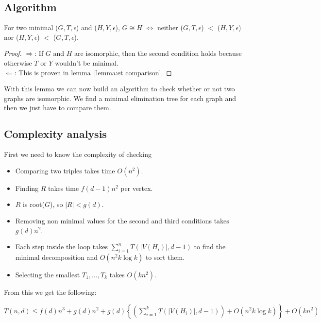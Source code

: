 \subsection{Algorithm}
\begin{lemma}
For two minimal ($G, T, \epsilon$) and ($H, Y, \epsilon$), $G \cong H$ $\iff$ neither ($G, T, \epsilon$) $<$ ($H, Y, \epsilon$) nor ($H, Y, \epsilon$) $<$ ($G, T, \epsilon$).
\end{lemma}



\begin{proof}
$\Longrightarrow$: If $G$ and $H$ are isomorphic, then the second condition holds because otherwise $T$ or $Y$ wouldn't be minimal.\\
$\Longleftarrow$: This is proven in lemma~\ref{lemma:et comparison}.
\end{proof}

With this lemma we can now build an algorithm to check whether or not two graphs are isomorphic. We find a minimal elimination tree for each graph and then we just have to compare them.







\subsection{Complexity analysis}

First we need to know the complexity of checking 

\begin{itemize}
\item Comparing two triples takes time $O(n^2)$.
\item Finding $R$ takes time $f(d-1)n^2$ per vertex.
\item $R$ is root($G$), so $|R| < g(d)$.
\item Removing non minimal values for the second and third conditions takes $g(d)n^2$.
\item Each step inside the loop takes $\sum\limits_{i=1}^n T(|V(H_i)|, d-1)$ to find the minimal decomposition and $O(n^2 k \log k)$ to sort them.
\item Selecting the smallest $T_1,\ldots, T_k$ takes $O(kn^2)$.
\end{itemize}

From this we get the following:

$T(n, d) \leq f(d)n^3 + g(d)n^2 + g(d) \left\{ \left(\sum\limits_{i=1}^k T(|V(H_i)|, d-1)\right) + O(n^2 k \log k) \right\} + O(kn^2)$